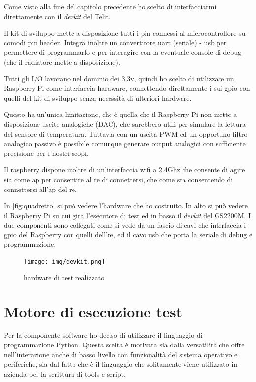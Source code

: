 \documentclass[12pt,a4paper,twoside,titlepage]{book}
\begin{document}
Come visto alla fine del capitolo precedente ho scelto di interfacciarmi direttamente con il \textit{devkit} 
del Telit. 

Il kit di sviluppo mette a disposizione tutti i pin connessi al microcontrollore
su comodi pin header. Integra inoltre un convertitore \Gls{uart} (seriale) - \acrshort{usb} per
permettere di programmarlo e per interagire con la eventuale console di debug
(che il radiatore mette a disposizione).

Tutti gli I/O lavorano nel dominio dei 3.3v, quindi ho scelto di utilizzare un
Raspberry Pi come interfaccia hardware, connettendo direttamente i sui \Gls{gpio} con
quelli del kit di sviluppo senza necessità di ulteriori hardware. 

Questo ha un'unica limitazione, che è quella che il Raspberry Pi non mette a disposizione
uscite analogiche (DAC), che sarebbero utili per simulare la lettura del sensore di
temperatura. Tuttavia con un uscita PWM ed un opportuno filtro analogico passivo è
possibile comunque generare output analogici con sufficiente precisione per i nostri scopi. 

Il raspberry dispone inoltre di un'interfaccia \Gls{wifi} a 2.4Ghz che consente di agire sia come 
\acrshort{ap} per consentire al \acrshort{re} di connettersi, che come \acrshort{sta} consentendo di 
connettersi all'\acrshort{ap} del \acrshort{re}.

In \autoref{fig:quadretto} si può vedere l'hardware che ho costruito. In alto si può 
vedere il Raspberry Pi su cui gira l'esecutore di test ed in basso il \textit{devkit} del GS2200M. 
I due componenti sono collegati come si vede da un fascio di cavi che interfaccia i \acrshort{gpio}
del Raspberry con quelli dell'\acrshort{re}, ed il cavo \acrshort{usb} che porta la seriale di debug
e programmazione. 

\begin{figure}
    \centering
    \texttt{[image: img/devkit.png]}
    \caption{hardware di test realizzato}
    \label{fig:quadretto}
\end{figure}

\section{Motore di esecuzione test}

Per la componente software ho deciso di utilizzare il linguaggio di programmazione
Python. Questa scelta è motivata sia dalla versatilità che offre nell'interazione anche
di basso livello con funzionalità del sistema operativo e periferiche, sia dal fatto
che è il linguaggio che solitamente viene utilizzato in azienda per la scrittura di
tools e script.
\end{document}
